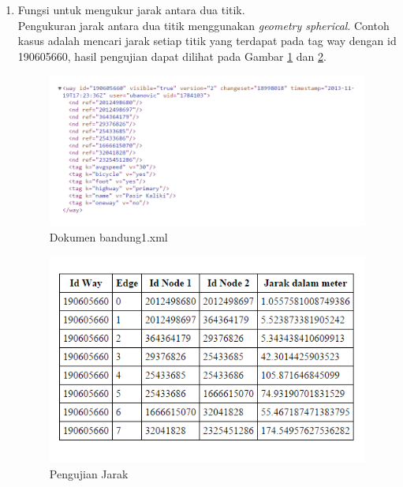 \begin{enumerate}
  \item Fungsi untuk mengukur jarak antara dua titik.\\
  Pengukuran jarak antara dua titik menggunakan \textit{geometry spherical}.
  Contoh kasus adalah mencari jarak setiap titik yang terdapat pada tag way
  dengan id 190605660, hasil pengujian dapat dilihat pada Gambar
  \ref{fig:pu_jarak1} dan \ref{fig:pu_jarak2}.
\begin{figure}[h]
\centering
\includegraphics[scale=0.7]{Gambar/pu_jarak1}
\caption[Dokumen test.xml]{Dokumen bandung1.xml}
\label{fig:pu_jarak1}
\end{figure}

\begin{figure}[h]
\centering
\includegraphics[scale=1]{Gambar/pu_jarak2}
\caption[Pengujian Jarak]{Pengujian Jarak}
\label{fig:pu_jarak2}
\end{figure}


\end{enumerate}

